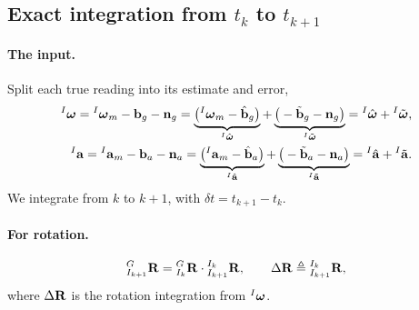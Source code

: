 \subsection{Exact integration from \texorpdfstring{$t_k$ to $t_{k+1}$}{tk to tk+1}}
\label{sec:lec05-exact}

\paragraph{The input.} Split each true reading into its estimate and error,
\begin{align}
{}^{I}\boldsymbol{\mathbf{\omega}} = {}^{I}\boldsymbol{\mathbf{\omega}}_m - \boldsymbol{\mathbf{b}}_g - \boldsymbol{\mathbf{n}}_g
= \underbrace{\big({}^{I}\boldsymbol{\mathbf{\omega}}_m - \hat{\boldsymbol{\mathbf{b}}}_g\big)}_{{}^{I}\hat{\boldsymbol{\mathbf{\omega}}}}
+ \underbrace{\big(-\tilde{\boldsymbol{\mathbf{b}}}_g - \boldsymbol{\mathbf{n}}_g\big)}_{{}^{I}\tilde{\boldsymbol{\mathbf{\omega}}}}
= {}^{I}\hat{\boldsymbol{\mathbf{\omega}}} + {}^{I}\tilde{\boldsymbol{\mathbf{\omega}}}, \\
{}^{I}\boldsymbol{\mathbf{a}} = {}^{I}\boldsymbol{\mathbf{a}}_m - \boldsymbol{\mathbf{b}}_a - \boldsymbol{\mathbf{n}}_a
= \underbrace{\big({}^{I}\boldsymbol{\mathbf{a}}_m - \hat{\boldsymbol{\mathbf{b}}}_a\big)}_{{}^{I}\hat{\boldsymbol{\mathbf{a}}}}
+ \underbrace{\big(-\tilde{\boldsymbol{\mathbf{b}}}_a - \boldsymbol{\mathbf{n}}_a\big)}_{{}^{I}\tilde{\boldsymbol{\mathbf{a}}}}
= {}^{I}\hat{\boldsymbol{\mathbf{a}}} + {}^{I}\tilde{\boldsymbol{\mathbf{a}}}.
\end{align}
We integrate from $k$ to $k+1$, with $\delta t = t_{k+1} - t_k$.

\paragraph{For rotation.}
\begin{align}
{}^{G}_{I_{k+1}}\boldsymbol{\mathbf{R}} = {}^{G}_{I_{k}}\boldsymbol{\mathbf{R}}\cdot{}^{I_k}_{I_{k+1}}\boldsymbol{\mathbf{R}}, \qquad
\Delta\boldsymbol{\mathbf{R}} \triangleq {}^{I_k}_{I_{k+1}}\boldsymbol{\mathbf{R}},
\end{align}
where $\Delta\boldsymbol{\mathbf{R}}$ is the rotation integration from ${}^{I}\boldsymbol{\mathbf{\omega}}$.

